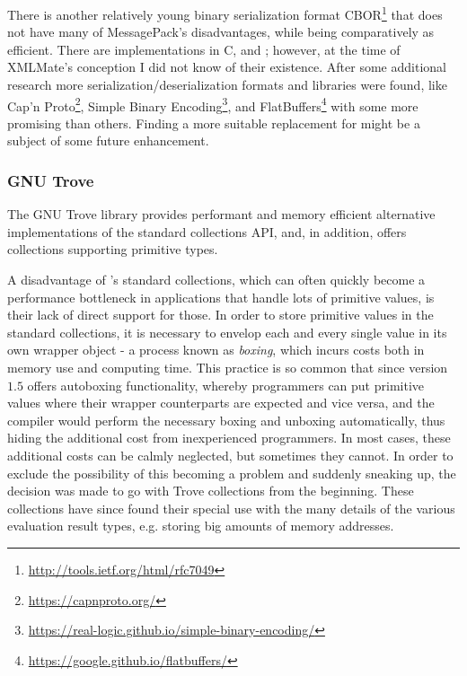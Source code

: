 There is another relatively young binary serialization format
{\small CBOR}\footnote{\url{http://tools.ietf.org/html/rfc7049}} that does not have many of {\small
MessagePack's} disadvantages, while being comparatively as efficient.
There are implementations in {\small C}, \python and \java; however, at the time of {\small XMLMate's}
conception I did not know of their existence. 
After some additional research more serialization/deserialization formats and libraries were found, like
{\small Cap'n Proto}\footnote{\url{https://capnproto.org/}},
{\small Simple Binary Encoding}\footnote{\url{https://real-logic.github.io/simple-binary-encoding/}}, and
{\small FlatBuffers}\footnote{\url{https://google.github.io/flatbuffers/}} with some more promising than
others. Finding a more suitable replacement for \msgpack might be a subject of some future enhancement.
\subsubsection{GNU Trove}
\label{sec:trove}
The GNU Trove \java library provides performant and memory efficient alternative implementations of the
standard \java collections API, and, in addition, offers collections supporting primitive types. 

A disadvantage of \java's standard collections, which can often quickly become a performance bottleneck in
applications that handle lots of primitive values, is their lack of direct support for those. In
order to store primitive values in the standard collections, it is necessary to envelop each and every single
value in its own wrapper object - a process known as \emph{boxing}, which incurs costs both in memory use and
computing time. This practice is so common that since version $1.5$ \java offers autoboxing functionality,
whereby programmers can put primitive values where their wrapper counterparts are expected and vice versa, and
the \java compiler would perform the necessary boxing and unboxing automatically, thus hiding the additional
cost from inexperienced programmers. In most cases, these additional costs can be calmly neglected, but
sometimes they cannot. In order to exclude the possibility of this becoming a problem and suddenly sneaking
up, the decision was made to go with Trove collections from the beginning. These collections have since found
their special use with the many details of the various evaluation result types, e.g. storing big amounts of
memory addresses.